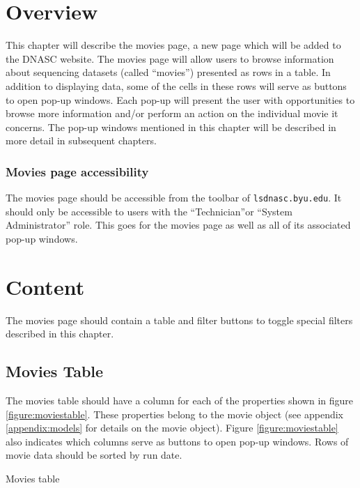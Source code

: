 
\section{Overview}

This chapter will describe the movies page, a new page which will be added to the
DNASC website. The movies page will allow users to browse information about sequencing datasets 
(called ``movies'') presented as rows in a table. In addition to displaying data, some of the 
cells in these rows will serve as buttons to open pop-up windows. Each pop-up will present 
the user with opportunities to browse more information and/or perform an action on the 
individual movie it concerns. The pop-up windows mentioned in this chapter will be described 
in more detail in subsequent chapters. 

\subsubsection{Movies page accessibility}

The movies page should be accessible from the toolbar of \texttt{lsdnasc.byu.edu}. It should
only be accessible to users with the ``Technician''or ``System Administrator'' role. This goes 
for the movies page as well as all of its associated pop-up windows.

\section{Content}

The movies page should contain a table and filter buttons to toggle special filters described 
in this chapter.

\subsection{Movies Table}

The movies table should have a column for each of the properties shown in figure 
\ref{figure:moviestable}. These properties belong to the movie object (see appendix 
\ref{appendix:models} for details on the movie object). Figure \ref{figure:moviestable} 
also indicates which columns serve as buttons to open pop-up windows. Rows of movie data 
should be sorted by run date.

\begin{table}[h]
    
    \caption{Movies table}
    \label{figure:moviestable}
\end{table}

